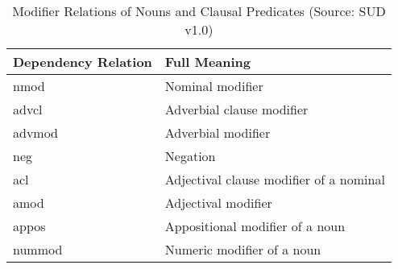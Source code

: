 \begin{table}%
\caption{Modifier Relations of Nouns and Clausal Predicates (Source: SUD v1.0)}
\label{tab:six}
\begin{minipage}{\columnwidth}
\begin{center}
\begin{tabular}{ll}
  \toprule
Dependency Relation &	Full Meaning \\
  \toprule
nmod	& Nominal modifier \\
advcl	& Adverbial clause modifier \\
advmod	& Adverbial modifier \\
neg	& Negation \\
acl	& Adjectival clause modifier of a nominal \\
amod	& Adjectival modifier \\
appos	& Appositional modifier of a noun \\
nummod	&  Numeric modifier of a noun \\
\bottomrule
\end{tabular}
\end{center}
\bigskip\centering

\end{minipage}
\end{table}%
 
